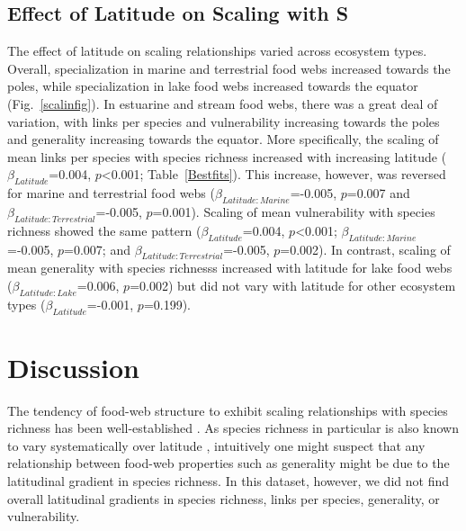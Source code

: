 \documentclass[12pt]{article}
\begin{document}
\subsection*{Effect of Latitude on Scaling with S}

The effect of latitude on scaling relationships varied across ecosystem types.
Overall, specialization in marine and terrestrial food webs increased towards the poles, 
while specialization in lake food webs increased towards the equator (Fig.~\ref{scalinfig}). 
In estuarine and stream food webs, there was a great deal of variation, with links per species
and vulnerability increasing towards the poles and generality increasing towards the equator.
More specifically, the scaling of mean links per species with species richness increased with
increasing latitude ($\beta_{Latitude}$=0.004, $p$\textless0.001; Table~\ref{Bestfits}). This
increase, however, was reversed for marine and terrestrial food webs
($\beta_{Latitude:Marine}$=-0.005, $p$=0.007 and
$\beta_{Latitude:Terrestrial}$=-0.005, $p$=0.001). Scaling of mean vulnerability with
species richness showed the same pattern ($\beta_{Latitude}$=0.004, $p$\textless0.001;
$\beta_{Latitude:Marine}$=-0.005, $p$=0.007; and $\beta_{Latitude:Terrestrial}$=-0.005, $p$=0.002).
In contrast, scaling of mean generality with species richnesss increased with latitude 
for lake food webs ($\beta_{Latitude:Lake}$=0.006, $p$=0.002) but did not vary with latitude for
other ecosystem types ($\beta_{Latitude}$=-0.001, $p$=0.199).

\section*{Discussion}

The tendency of food-web structure to exhibit scaling relationships with
species richness has been well-established \citep{Dunne2004,Riede2010}. As
species richness in particular is also known to vary systematically over
latitude \citep{}, intuitively one might suspect that any relationship
between food-web properties such as generality might be due to the latitudinal
gradient in species richness. In this dataset, however, we did not find
overall latitudinal gradients in species richness, links per species, 
generality, or vulnerability. 
\end{document}
